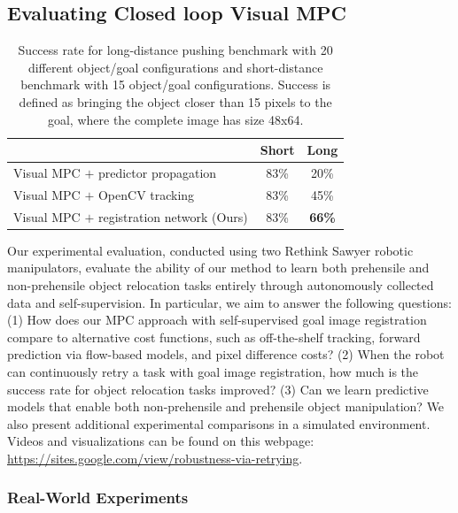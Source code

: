 \subsection{Evaluating Closed loop Visual MPC}

\begin{table}
	{\footnotesize
		\begin{center}
			\begin{tabular}{lcc}
				\toprule
				& Short & Long \\
				\midrule
				Visual MPC $+$ predictor propagation  & 83\% & 20\% \\
				Visual MPC $+$ OpenCV tracking  & 83\%  & 45\% \\
				Visual MPC $+$ registration network (Ours)  & 83\% & \textbf{66\%}  \\
				\bottomrule
			\end{tabular}
		\end{center}
	}
	\caption{\small Success rate for long-distance pushing benchmark with 20 different object/goal configurations and short-distance benchmark with 15 object/goal configurations. Success is defined as bringing the object closer than 15 pixels to the goal, where the complete image has size 48x64.}
	\label{table:res_longd}
\end{table}



Our experimental evaluation, conducted using two Rethink Sawyer robotic manipulators, evaluate the ability of our method to learn both prehensile and non-prehensile object relocation tasks entirely through autonomously collected data and self-supervision. In particular, we aim to answer the following questions: (1) How does our MPC approach with self-supervised goal image registration compare to alternative cost functions, such as off-the-shelf tracking, forward prediction via flow-based models, and pixel difference costs? (2) When the robot can continuously retry a task with goal image registration, how much is the success rate for object relocation tasks improved? (3) Can we learn predictive models that enable both non-prehensile and prehensile object manipulation? We also present additional experimental comparisons in a simulated environment.
Videos and visualizations can be found on this webpage: \url{https://sites.google.com/view/robustness-via-retrying}.

\subsubsection{Real-World Experiments}



